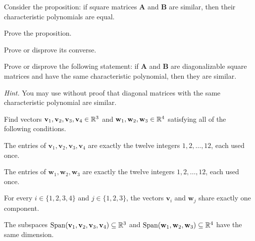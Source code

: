 \documentclass[11pt,oneside]{article}
\begin{document}
\begin{problem}
Consider the proposition: if square matrices $\mathbf A$ and $\mathbf B$ are similar, then their characteristic polynomials are equal.
\begin{problemsubparts}
\item Prove the proposition.
\item Prove or disprove its converse.
\item Prove or disprove the following statement: if $\mathbf A$ and $\mathbf B$ are diagonalizable square matrices and have the same characteristic polynomial, then they are similar.
\end{problemsubparts}
\textit{Hint.} You may use without proof that diagonal matrices with the same characteristic polynomial are similar.
\end{problem}

\begin{problem}
Find vectors $\mathbf v_1,\mathbf v_2,\mathbf v_3,\mathbf v_4\in\mathbb{R}^3$ and $\mathbf w_1,\mathbf w_2,\mathbf w_3\in\mathbb{R}^4$ satisfying all of the following conditions.
\begin{problemclauses}
\item The entries of $\mathbf v_1,\mathbf v_2,\mathbf v_3,\mathbf v_4$ are exactly the twelve integers $1,2,\dots,12$, each used once.
\item The entries of $\mathbf w_1,\mathbf w_2,\mathbf w_3$ are exactly the twelve integers $1,2,\dots,12$, each used once.
\item For every $i\in\{1,2,3,4\}$ and $j\in\{1,2,3\}$, the vectors $\mathbf v_i$ and $\mathbf w_j$ share exactly one component.
\item The subspaces $\operatorname{Span}(\mathbf v_1,\mathbf v_2,\mathbf v_3,\mathbf v_4)\subseteq\mathbb{R}^3$ and $\operatorname{Span}(\mathbf w_1,\mathbf w_2,\mathbf w_3)\subseteq\mathbb{R}^4$ have the same dimension.
\end{problemclauses}
\end{problem}
\end{document}
